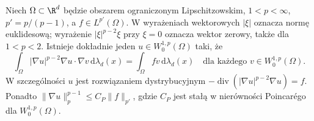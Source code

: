 \begin{twierdzenie}
\label{thm:pde11-plaplace}
Niech $\Omega\subset\R^d$ będzie obszarem ograniczonym Lipschitzowskim, $1<p<\infty$, $p'=p/(p-1)$,
a $f\in L^{p'}(\Omega)$. W wyrażeniach wektorowych
$|\xi|$ oznacza normę euklidesową; wyrażenie
$|\xi|^{p-2}\xi$ przy $\xi=0$ oznacza wektor zerowy,
także dla $1<p<2$. Istnieje dokładnie jeden
$u\in W_0^{1,p}(\Omega)$ taki, że
\[
\int_\Omega |\nabla u|^{p-2}\nabla u\cdot\nabla v
\,\mathrm d\lambda_d(x)
=\int_\Omega fv\,\mathrm d\lambda_d(x)
\quad\text{dla każdego }v\in W_0^{1,p}(\Omega).
\]
W szczególności $u$ jest rozwiązaniem dystrybucyjnym
$-\operatorname{div}(|\nabla u|^{p-2}\nabla u)=f$.
Ponadto
$\|\nabla u\|_p^{p-1}\le C_P\|f\|_{p'}$,
gdzie $C_P$ jest stałą w nierówności Poincarégo
dla $W_0^{1,p}(\Omega)$.
\end{twierdzenie}
